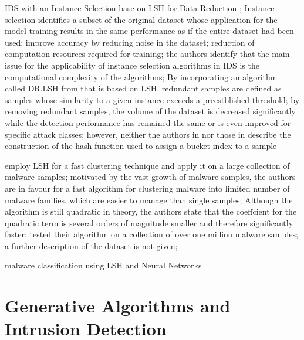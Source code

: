 \documentclass[../../main.tex]{subfiles}
\begin{document}
IDS with an Instance Selection base on LSH for Data Reduction \cite{baldini2021intrusion}; Instance selection identifies a subset of the original dataset whose application for the model training results in the same performance as if the entire dataset had been used;
improve accuracy by reducing noise in the dataset; reduction of computation resources required for training; the authors identify that the main issue for the applicability of instance selection algorithms in IDS is the computational complexity of the algorithms; By incorporating an algorithm called DR.LSH from \cite{aslani2020fast} that is based on LSH, redundant samples are defined as samples whose similarity to a given instance exceeds a preestblished threshold; by removing redundant samples, the volume of the dataset is decreased significantly while the detection performance has remained the same or is even improved for specific attack classes; however, neither the authors in \cite{baldini2021intrusion} nor those in \cite{aslani2020fast} describe the construction of the hash function used to assign a bucket index to a sample


\cite{opricsa2014locality} employ LSH for a fast clustering technique and apply it on a large collection of malware samples; motivated by the vast growth of malware samples, the authors are in favour for a fast algorithm for clustering malware into limited number of malware families, which are easier to manage than single samples; Although the algorithm is still quadratic in theory, the authors state that the coeffcient for the quadratic term is several orders of magnitude smaller and therefore significantly faster;
tested their algorithm on a collection of over one million malware samples; a further description of the dataset is not given; 

\cite{ludwig_friborg_malware_2019} malware classification using LSH and Neural Networks

\newpage
\section{Generative Algorithms and Intrusion Detection}
\end{document}
